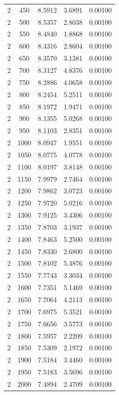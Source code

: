 \begin{longtable}{ccccc}
    2 & 450 & 8.5912 & 3.6891 & 0.00100 \\
    2 & 500 & 8.5357 & 2.8038 & 0.00100 \\
    2 & 550 & 8.4840 & 1.8868 & 0.00100 \\
    2 & 600 & 8.4316 & 2.8604 & 0.00100 \\
    2 & 650 & 8.3570 & 3.1381 & 0.00100 \\
    2 & 700 & 8.3127 & 4.8376 & 0.00100 \\
    2 & 750 & 8.2886 & 4.0658 & 0.00100 \\
    2 & 800 & 8.2454 & 5.2511 & 0.00100 \\
    2 & 850 & 8.1972 & 1.9471 & 0.00100 \\
    2 & 900 & 8.1355 & 5.0268 & 0.00100 \\
    2 & 950 & 8.1103 & 2.8351 & 0.00100 \\
    2 & 1000 & 8.0947 & 1.9551 & 0.00100 \\
    2 & 1050 & 8.0775 & 4.0778 & 0.00100 \\
    2 & 1100 & 8.0197 & 3.8148 & 0.00100 \\
    2 & 1150 & 7.9979 & 2.7464 & 0.00100 \\
    2 & 1200 & 7.9862 & 3.0723 & 0.00100 \\
    2 & 1250 & 7.9720 & 5.0216 & 0.00100 \\
    2 & 1300 & 7.9125 & 3.4306 & 0.00100 \\
    2 & 1350 & 7.8703 & 3.1937 & 0.00100 \\
    2 & 1400 & 7.8463 & 5.2500 & 0.00100 \\
    2 & 1450 & 7.8330 & 2.6800 & 0.00100 \\
    2 & 1500 & 7.8102 & 5.4876 & 0.00100 \\
    2 & 1550 & 7.7743 & 3.3034 & 0.00100 \\
    2 & 1600 & 7.7351 & 5.1469 & 0.00100 \\
    2 & 1650 & 7.7064 & 4.2113 & 0.00100 \\
    2 & 1700 & 7.6975 & 5.3521 & 0.00100 \\
    2 & 1750 & 7.6656 & 3.5773 & 0.00100 \\
    2 & 1800 & 7.5957 & 2.2209 & 0.00100 \\
    2 & 1850 & 7.5309 & 2.1972 & 0.00100 \\
    2 & 1900 & 7.5184 & 3.4460 & 0.00100 \\
    2 & 1950 & 7.5183 & 3.5696 & 0.00100 \\
    2 & 2000 & 7.4894 & 2.4709 & 0.00100 \\

\end{longtable}
